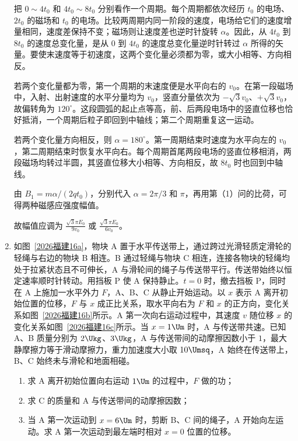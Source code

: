 \documentclass[\gkver]{gaokaozhenti}
\begin{document}
\begin{enumerate}
{把 $0\sim4t_0$ 和 $4t_0\sim8t_0$ 分别看作一个周期。每个周期都依次经历 $t_0$ 的电场、$2t_0$ 的磁场和 $t_0$ 的电场。比较两周期内同一阶段的速度，电场给它们的速度增量相同，速度差保持不变；磁场则让速度差也逆时针旋转 $\alpha$。因此，从 $4t_0$ 到 $8t_0$ 的速度总变化量，是从 0 到 $4t_0$ 的速度总变化量逆时针转过 $\alpha$ 所得的矢量。要使末速度等于初速度，这两个变化量必须都为零，或大小相等、方向相反。

若两个变化量都为零，第一个周期的末速度便是水平向右的 $v_0$。在第一段磁场中，入射、出射速度的水平分量均为 $v_0$，竖直分量依次为 $-\sqrt3v_0$、$+\sqrt3v_0$，故偏转角为 $120^\circ$。这段圆弧的起止点等高，前、后两段电场中的竖直位移也恰好抵消，一个周期后粒子即回到中轴线；第二个周期重复这一运动。

若两个变化量方向相反，则 $\alpha=180^\circ$。第一周期结束时速度为水平向左的 $v_0$，第二周期结束时恢复水平向右。每个周期首尾两段电场的竖直位移相消，两段磁场均转过半圆，其竖直位移大小相等、方向相反，故 $8t_0$ 时也回到中轴线。

由 $B_1=m\alpha/(2qt_0)$，分别代入 $\alpha=2\pi/3$ 和 $\pi$，再用第（1）问的比荷，可得两种磁感应强度幅值。

故幅值应调为 $\frac{\sqrt3\pi E_0}{9v_0}$ 或 $\frac{\sqrt3\pi E_0}{6v_0}$。
}

\item
如图~\ref{2026福建16a}，物块 A 置于水平传送带上，通过跨过光滑轻质定滑轮的轻绳与右边的物块 B 相连。B 通过轻绳与物块 C 相连，连接各物块的轻绳均处于拉紧状态且不可伸长，A 与滑轮间的绳子与传送带平行。传送带始终以恒定速率顺时针转动。用挡板 P 使 A 保持静止。$t=0$ 时，撤去挡板 P，同时在 A 上施加一水平外力 $F$，A、B、C 从静止开始运动。以 $x$ 表示 A 离开初始位置的位移，$F$ 与 $x$ 成正比关系，取水平向右为 $F$ 和 $x$ 的正方向，变化关系如图~\ref{2026福建16b}所示。A 第一次向右运动过程中，其速度 $v$ 随位移 $x$ 的变化关系如图~\ref{2026福建16c}所示。当 $x=1\Um$ 时，A 与传送带共速。已知 A、B 质量分别为 $2\Ukg$、$3\Ukg$，A 与传送带间的动摩擦因数小于 $1$，最大静摩擦力等于滑动摩擦力，重力加速度大小取 $10\Umsq$，A 始终在传送带上，B、C 始终未与滑轮和地面相碰。
\begin{enumerate}
	\item
	求 A 离开初始位置向右运动 $1\Um$ 的过程中，$F$ 做的功；
	\item
	求 C 的质量和 A 与传送带间的动摩擦因数；
	\item
	当 A 第一次运动到 $x=6\Um$ 时，剪断 B、C 间的绳子，A 开始向左运动。求 A 第一次运动到最左端时相对 $x=0$ 位置的位移。
\end{enumerate}
\jdanswer{
\begin{enumerate}
	\item
	$-10\UJ$


\end{enumerate}}
\end{enumerate}
\end{document}
